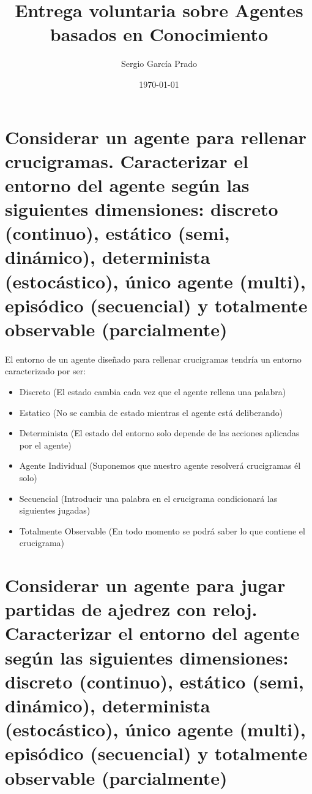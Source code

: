 \documentclass[10pt, a4paper,spanish]{article}
\title{\vspace{-15mm}\fontsize{24pt}{10pt}\selectfont\textbf{Entrega voluntaria sobre Agentes basados en Conocimiento}} %
\author{Sergio García Prado}
\date{\today}
\begin{document}
	\maketitle %

	\thispagestyle{fancy} %


	\section{Considerar un agente para rellenar crucigramas. Caracterizar el entorno del agente según las siguientes dimensiones: discreto (continuo), estático (semi, dinámico), determinista (estocástico), único agente (multi), episódico (secuencial) y totalmente observable (parcialmente)}

		\paragraph{}
		El entorno de un agente diseñado para rellenar crucigramas tendría un entorno caracterizado por ser:

		\begin{itemize}
			\item Discreto (El estado cambia cada vez que el agente rellena una palabra)
			\item Estatico (No se cambia de estado mientras el agente está deliberando)
			\item Determinista (El estado del entorno solo depende de las acciones aplicadas por el agente)
			\item Agente Individual (Suponemos que nuestro agente resolverá crucigramas él solo)
			\item Secuencial (Introducir una palabra en el crucigrama condicionará las siguientes jugadas)
			\item Totalmente Observable (En todo momento se podrá saber lo que contiene el crucigrama)
		\end{itemize}



	\section{Considerar un agente para jugar partidas de ajedrez con reloj. Caracterizar el entorno del agente según las siguientes dimensiones: discreto (continuo), estático (semi, dinámico), determinista (estocástico), único agente (multi), episódico (secuencial) y totalmente observable (parcialmente)}
\end{document}
